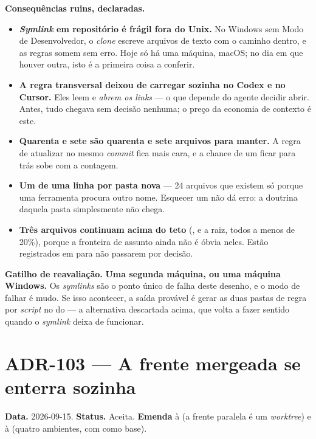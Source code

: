 \textbf{Consequências ruins, declaradas.}

\begin{itemize}
  \item \textbf{\emph{Symlink} em repositório é frágil fora do Unix.} No Windows
    sem Modo de Desenvolvedor, o \emph{clone} escreve arquivos de texto com o
    caminho dentro, e as regras somem sem erro. Hoje só há uma máquina, macOS;
    no dia em que houver outra, isto é a primeira coisa a conferir.
  \item \textbf{A regra transversal deixou de carregar sozinha no Codex e no
    Cursor.} Eles leem  e \emph{abrem os links} --- o que
    depende do agente decidir abrir. Antes, tudo chegava sem decisão nenhuma;
    o preço da economia de contexto é este.
  \item \textbf{Quarenta e sete  são quarenta e sete arquivos
    para manter.} A regra de atualizar no mesmo \emph{commit} fica mais cara,
    e a chance de um ficar para trás sobe com a contagem.
  \item \textbf{Um  de uma linha por pasta nova} --- 24
    arquivos que existem só porque uma ferramenta procura outro nome. Esquecer
    um não dá erro: a doutrina daquela pasta simplesmente não chega.
  \item \textbf{Três arquivos continuam acima do teto} (,
     e a raiz, todos a menos de 20\%), porque a fronteira de
    assunto ainda não é óbvia neles. Estão registrados em
     para não passarem por decisão.
\end{itemize}

\textbf{Gatilho de reavaliação.} \textbf{Uma segunda máquina, ou uma máquina
Windows.} Os \emph{symlinks} são o ponto único de falha deste desenho, e o modo
de falhar é mudo. Se isso acontecer, a saída provável é gerar as duas pastas de
regra por \emph{script} no  do  --- a alternativa
descartada acima, que volta a fazer sentido quando o \emph{symlink} deixa de
funcionar.


\section{ADR-103 --- A frente mergeada se enterra sozinha}
\label{adr:poda-de-worktree}

\textbf{Data.} 2026-09-15. \textbf{Status.} Aceita.
\textbf{Emenda} à  (a frente paralela é um \emph{worktree}) e à
 (quatro ambientes, com  como base).

